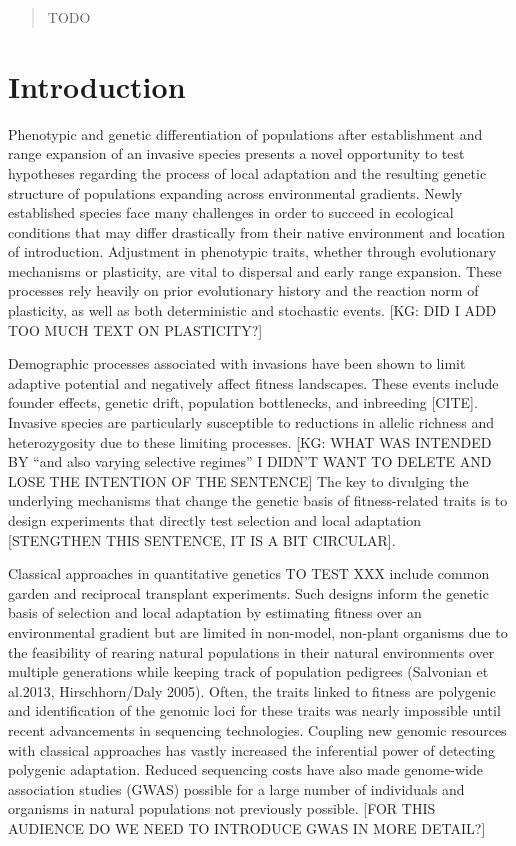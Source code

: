\documentclass[smallextended]{svjour3}
\begin{document}
\begin{abstract}
TODO

\keywords{}

\end{abstract}


\thispagestyle{empty}

\linenumbers%

\section*{Introduction}


Phenotypic and genetic differentiation of populations after establishment and
range expansion of an invasive species presents a novel opportunity to test
hypotheses regarding the process of local adaptation and the resulting genetic
structure of populations expanding across environmental gradients. Newly
established species face many challenges in order to succeed in
ecological conditions that may differ drastically from their native environment
and location of introduction. Adjustment in phenotypic traits, whether through
evolutionary mechanisms or plasticity, are vital to dispersal and early range
expansion. These processes rely heavily on prior evolutionary history and the
reaction norm of plasticity, as well as both deterministic and stochastic
events. [KG: DID I ADD TOO MUCH TEXT ON PLASTICITY?]

Demographic processes associated with invasions have been shown to limit
adaptive potential and negatively affect fitness landscapes. These events
include founder effects, genetic drift, population bottlenecks, and inbreeding
[CITE].  Invasive species are particularly susceptible to reductions in allelic
richness and heterozygosity due to these limiting processes. [KG: WHAT WAS
INTENDED BY ``and also varying selective regimes'' I DIDN'T WANT TO DELETE AND
LOSE THE INTENTION OF THE SENTENCE]  The key to divulging the underlying
mechanisms that change the genetic basis of fitness-related traits is to design
experiments that directly test selection and local adaptation [STENGTHEN THIS
SENTENCE, IT IS A BIT CIRCULAR].

Classical approaches in quantitative genetics TO TEST XXX include common garden
and reciprocal transplant experiments. Such designs inform the genetic basis of
selection and local adaptation by estimating fitness over an environmental
gradient but are limited in non-model, non-plant organisms due to the
feasibility of rearing natural populations in their natural environments over
multiple generations while keeping track of population pedigrees (Salvonian et
al.2013, Hirschhorn/Daly 2005). Often, the traits linked to fitness are
polygenic and identification of the genomic loci for these traits was nearly
impossible until recent advancements in sequencing technologies. Coupling new
genomic resources with classical approaches has vastly increased the
inferential
power of detecting polygenic adaptation. Reduced sequencing costs have also
made
genome-wide association studies (GWAS) possible for a large number of
individuals and organisms in natural populations not previously possible. [FOR
THIS AUDIENCE DO WE NEED TO INTRODUCE GWAS IN MORE DETAIL?]
\end{document}
